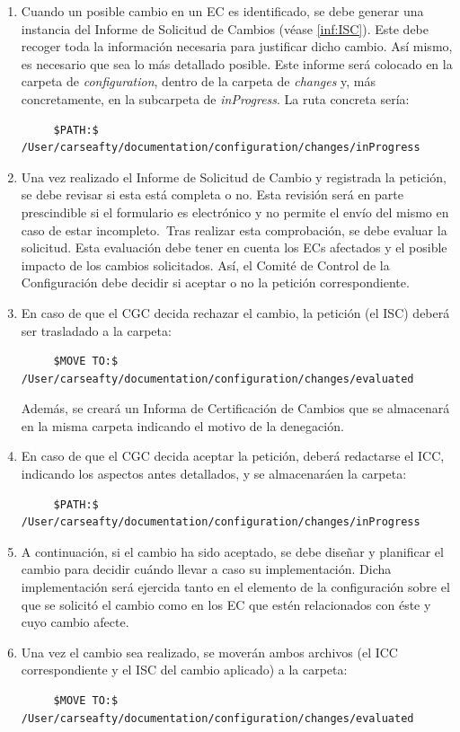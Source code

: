 \begin{enumerate}

  \item Cuando un posible cambio en un EC es identificado, se debe generar una instancia del Informe de Solicitud de Cambios (véase \ref{inf:ISC}). Este debe recoger toda la información necesaria para justificar dicho cambio. Así mismo, es necesario que sea lo más detallado posible. Este informe será colocado en la carpeta de \textit{configuration}, dentro de la carpeta de \textit{changes} y, más concretamente, en la subcarpeta de \textit{inProgress}. La ruta concreta sería:
  \begin{lstlisting}
     $PATH:$ /User/carseafty/documentation/configuration/changes/inProgress
  \end{lstlisting}

  \item Una vez realizado el Informe de Solicitud de Cambio y registrada la petición, se debe revisar si esta está completa o no. Esta revisión será en parte prescindible si el formulario es electrónico y no permite el envío del mismo en caso de estar incompleto. Tras realizar esta comprobación, se debe evaluar la solicitud. Esta evaluación debe tener en cuenta los ECs afectados y el posible impacto de los cambios solicitados. Así, el Comité de Control de la Configuración debe decidir si aceptar o no la petición correspondiente.

  \item En caso de que el CGC decida rechazar el cambio, la petición (el ISC) deberá ser trasladado a la carpeta:
  \begin{lstlisting}
     $MOVE TO:$ /User/carseafty/documentation/configuration/changes/evaluated
  \end{lstlisting}
  Además, se creará un Informa de Certificación de Cambios que se almacenará en la misma carpeta indicando el motivo de la denegación.

  \item En caso de que el CGC decida aceptar la petición, deberá redactarse el ICC, indicando los aspectos antes detallados, y se almacenaráen la carpeta:
  \begin{lstlisting}
     $PATH:$ /User/carseafty/documentation/configuration/changes/inProgress
  \end{lstlisting}

  \item A continuación, si el cambio ha sido aceptado, se debe diseñar y planificar el cambio para decidir cuándo llevar a caso su implementación. Dicha implementación será ejercida tanto en el elemento de la configuración sobre el que se solicitó el cambio como en los EC que estén relacionados con éste y cuyo cambio afecte.

  \item Una vez el cambio sea realizado, se moverán ambos archivos (el ICC correspondiente y el ISC del cambio aplicado) a la carpeta:
  \begin{lstlisting}
     $MOVE TO:$ /User/carseafty/documentation/configuration/changes/evaluated
  \end{lstlisting}

\end{enumerate}


